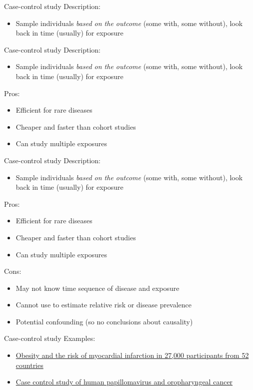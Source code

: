 \documentclass[10pt,t]{beamer}
\begin{document}
\begin{frame}{Case-control study}
Description:
\begin{itemize}
	\item Sample individuals \textit{based on the outcome} (some with, some without), look back in time (usually) for exposure
\end{itemize}
\end{frame}

\begin{frame}{Case-control study}
Description:
\begin{itemize}
	\item Sample individuals \textit{based on the outcome} (some with, some without), look back in time (usually) for exposure
\end{itemize}
Pros:
\begin{itemize}
	\item Efficient for rare diseases
	\item Cheaper and faster than cohort studies
	\item Can study multiple exposures
\end{itemize}
\end{frame}

\begin{frame}{Case-control study}
Description:
\begin{itemize}
	\item Sample individuals \textit{based on the outcome} (some with, some without), look back in time (usually) for exposure
\end{itemize}
Pros:
\begin{itemize}
	\item Efficient for rare diseases
	\item Cheaper and faster than cohort studies
	\item Can study multiple exposures
\end{itemize}
Cons:
\begin{itemize}
	\item May not know time sequence of disease and exposure
	\item Cannot use to estimate relative risk or disease prevalence %
	\item Potential confounding (so no conclusions about causality)
\end{itemize}
\end{frame}

\begin{frame}[c]{Case-control study}
Examples:
\vspace{0.3cm}

\begin{itemize}
	\item \href{https://www.sciencedirect.com/science/article/pii/S0140673605676635}{\color{cyan}Obesity and the risk of myocardial infarction in 27,000 participants from 52 countries}
	\item \href{http://www.nejm.org/doi/full/10.1056/NEJMoa065497\#t=article}{\color{cyan}Case control study of human papillomavirus and oropharyngeal cancer}
\end{itemize}

\end{frame}
\end{document}
